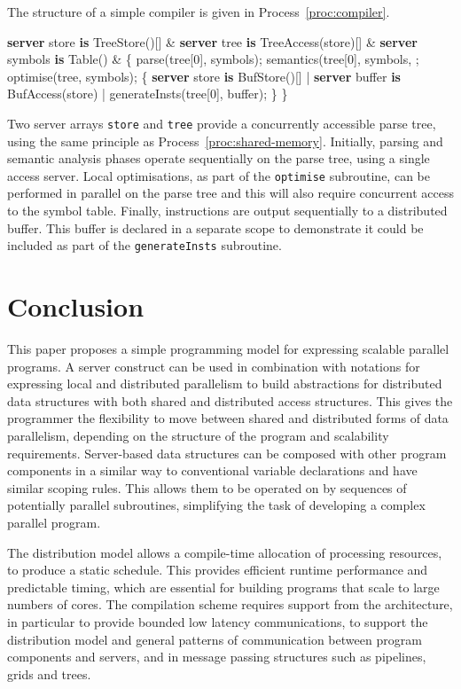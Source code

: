 \documentclass[11pt, conference, compsocconf, onecolumn]{IEEEtran}
\newcommand{\ttt}[1]{\texttt{#1}}
\newcommand{\proc}[1]{Process~\ref{proc:#1}}
\newcounter{process}
\newenvironment{Process}[1][]{\begin{procfloat}[ht]\vspace{-1.5mm}\refstepcounter{process}{\bf Process~\theprocess} #1}
{\vspace{-3.5mm}\end{procfloat}}
\newcommand{\w}[1]{{\bf #1}}
\def\codespacing{1.5mm}
\newenvironment{myquote}
{\list{}{\leftmargin=4mm\rightmargin=4mm}\item[]}
{\endlist}
\newenvironment{code*}{\vspace{\codespacing}\begin{myquote}\begin{minipage}{\linewidth}\begin{alltt}}
{\end{alltt}\end{minipage}
\end{myquote}\vspace{\codespacing}
}
\begin{document}
The structure of a simple compiler is given in \proc{compiler}. 
\begin{Process}
\begin{code*}
\w{server} store \w{is} TreeStore()[] &
\w{server} tree \w{is} TreeAccess(store)[] &
\w{server} symbols \w{is} Table() &
\{ parse(tree[0], symbols);
  semantics(tree[0], symbols, ;
  optimise(tree, symbols);
  \{ \w{server} store \w{is} BufStore()[] |
    \w{server} buffer \w{is} BufAccess(store) |
    generateInsts(tree[0], buffer);
  \}
\}
\end{code*}
\label{proc:compiler}
\end{Process}
Two server arrays \ttt{store} and \ttt{tree} provide a concurrently accessible
parse tree, using the same principle as \proc{shared-memory}. Initially, parsing and
semantic analysis phases operate sequentially on the parse tree, using a single
access server. Local optimisations, as part of the \ttt{optimise} subroutine,
can be performed in parallel on the parse tree and this will also require
concurrent access to the symbol table. Finally, instructions are
output sequentially to a distributed buffer. This buffer is declared in a separate
scope to demonstrate it could be included as part of the \ttt{generateInsts}
subroutine.





\section{Conclusion\label{sec:conclusion}}

This paper proposes a simple programming model for expressing scalable parallel
programs. 
A server construct can be used in combination with notations for expressing
local and distributed parallelism to build abstractions for distributed data
structures with both shared and distributed access structures. This gives the
programmer the flexibility to move between shared and distributed forms of data
parallelism, depending on the structure of the program and scalability
requirements. 
Server-based data structures can be composed with other program components in a
similar way to conventional variable declarations and have similar scoping
rules. This allows them to be operated on by sequences of potentially parallel
subroutines, simplifying the task of developing a complex parallel program.

The distribution model allows a compile-time allocation of processing
resources, to produce a static schedule. This provides efficient runtime
performance and predictable timing, which are essential for building programs
that scale to large numbers of cores.
The compilation scheme requires support from the architecture, in particular to
provide bounded low latency communications, to support the distribution model
and general patterns of communication between program components and servers,
and in message passing structures such as pipelines, grids and trees.
\end{document}

